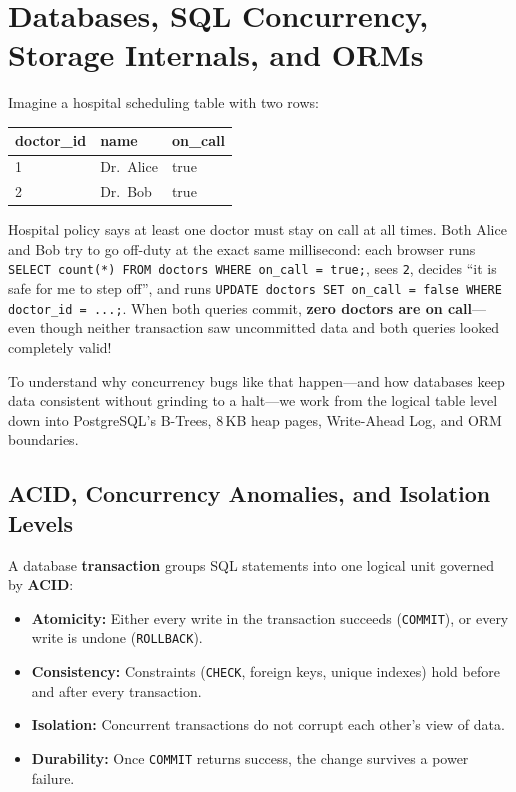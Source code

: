 \chapter{Databases, SQL Concurrency, Storage Internals, and ORMs}
\label{chap:databases}

Imagine a hospital scheduling table with two rows:

\begin{center}
\small\ttfamily
\begin{tabular}{@{}lll@{}}
\toprule
\textbf{doctor\_id} & \textbf{name} & \textbf{on\_call} \\ \midrule
1 & Dr.\ Alice & true \\
2 & Dr.\ Bob & true \\ \bottomrule
\end{tabular}
\end{center}

Hospital policy says at least one doctor must stay on call at all times. Both Alice and Bob try to go off-duty at the exact same millisecond: each browser runs \texttt{SELECT count(*) FROM doctors WHERE on\_call = true;}, sees \texttt{2}, decides ``it is safe for me to step off'', and runs \texttt{UPDATE doctors SET on\_call = false WHERE doctor\_id = ...;}. When both queries commit, \textbf{zero doctors are on call}---even though neither transaction saw uncommitted data and both queries looked completely valid!

To understand why concurrency bugs like that happen---and how databases keep data consistent without grinding to a halt---we work from the logical table level down into PostgreSQL's B-Trees, 8\,KB heap pages, Write-Ahead Log, and ORM boundaries.

\section{ACID, Concurrency Anomalies, and Isolation Levels}

A database \textbf{transaction} groups SQL statements into one logical unit governed by \textbf{ACID}:
\begin{itemize}[leftmargin=15pt]
  \item \textbf{Atomicity:} Either every write in the transaction succeeds (\texttt{COMMIT}), or every write is undone (\texttt{ROLLBACK}).
  \item \textbf{Consistency:} Constraints (\texttt{CHECK}, foreign keys, unique indexes) hold before and after every transaction.
  \item \textbf{Isolation:} Concurrent transactions do not corrupt each other's view of data.
  \item \textbf{Durability:} Once \texttt{COMMIT} returns success, the change survives a power failure.
\end{itemize}

